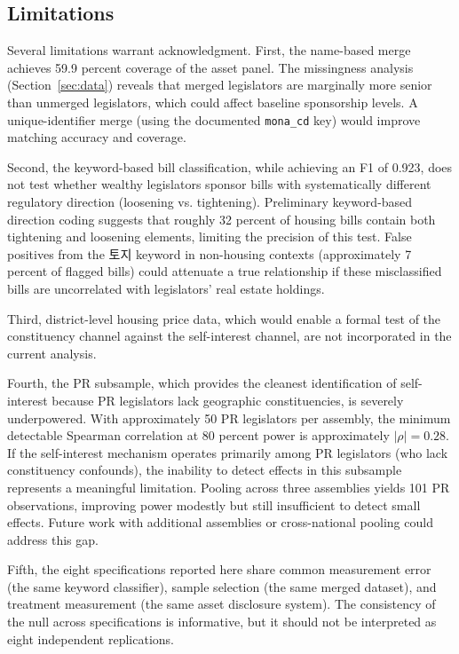 \documentclass[11pt]{article}
\begin{document}
\subsection{Limitations}

Several limitations warrant acknowledgment. First, the name-based merge achieves 59.9 percent coverage of the asset panel. The missingness analysis (Section~\ref{sec:data}) reveals that merged legislators are marginally more senior than unmerged legislators, which could affect baseline sponsorship levels. A unique-identifier merge (using the documented \texttt{mona\_cd} key) would improve matching accuracy and coverage.

Second, the keyword-based bill classification, while achieving an F1 of 0.923, does not test whether wealthy legislators sponsor bills with systematically different regulatory direction (loosening vs. tightening). Preliminary keyword-based direction coding suggests that roughly 32 percent of housing bills contain both tightening and loosening elements, limiting the precision of this test. False positives from the 토지 keyword in non-housing contexts (approximately 7 percent of flagged bills) could attenuate a true relationship if these misclassified bills are uncorrelated with legislators' real estate holdings.

Third, district-level housing price data, which would enable a formal test of the constituency channel against the self-interest channel, are not incorporated in the current analysis.

Fourth, the PR subsample, which provides the cleanest identification of self-interest because PR legislators lack geographic constituencies, is severely underpowered. With approximately 50 PR legislators per assembly, the minimum detectable Spearman correlation at 80 percent power is approximately $|\rho| = 0.28$. If the self-interest mechanism operates primarily among PR legislators (who lack constituency confounds), the inability to detect effects in this subsample represents a meaningful limitation. Pooling across three assemblies yields 101 PR observations, improving power modestly but still insufficient to detect small effects. Future work with additional assemblies or cross-national pooling could address this gap.

Fifth, the eight specifications reported here share common measurement error (the same keyword classifier), sample selection (the same merged dataset), and treatment measurement (the same asset disclosure system). The consistency of the null across specifications is informative, but it should not be interpreted as eight independent replications.
\end{document}
